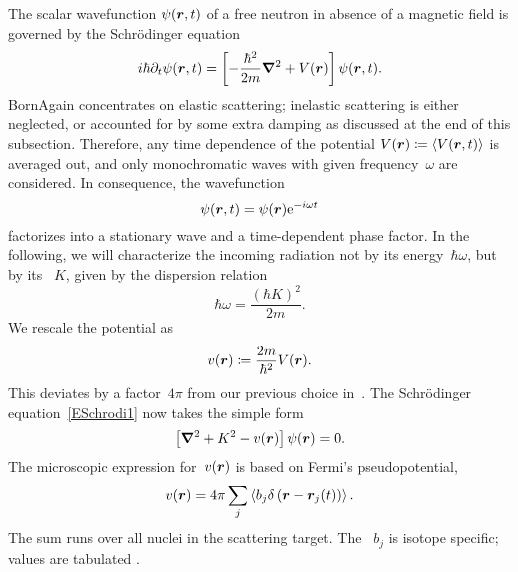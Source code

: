 The scalar wavefunction $\psi(\bm{r},t)$
%
%
%
of a free neutron
in absence of a magnetic field
is governed by the Schrödinger equation
%
\begin{equation}\label{ESchrodi1}
  i\hbar\partial_t \psi(\r,t)
  = \left[-\frac{\hbar^2}{2m}\Nabla^2+V(\r)\right] \psi(\r,t).
\end{equation}
BornAgain concentrates on elastic scattering;
%
inelastic scattering is either neglected,
%
or accounted for by some extra damping as discussed at the end of this subsection.
%
Therefore, any time dependence of the potential
%
%
$V(\bm{r})\coloneqq \langle V(\bm{r},t)\rangle$
%
 is averaged out,
and only monochromatic waves
with given frequency~$\omega$ are considered.
%
%
In consequence, the wavefunction
\begin{equation}\label{Estationarywave}
  \psi(\r,t) = \psi(\r)\e^{-i\omega t}
\end{equation}
%
factorizes into a stationary wave and a time-dependent phase factor.
%
In the following, we will characterize the incoming radiation
not by its energy~$\hbar\omega$,
but by its ~$K$,
%
%
given by the dispersion relation
%
\begin{equation}
  \hbar\omega = \frac{(\hbar K)^2}{2m}.
\end{equation}
We rescale the potential as
\begin{equation}\label{EvScale}
  v(\r)
  \coloneqq \frac{2m}{\hbar^2} V(\r).
\end{equation}
This deviates by a factor~$4\pi$ from our previous choice in~\cite{PoHB20}.
The Schrödinger equation~\cref{ESchrodi1} now takes the simple form
%
\begin{equation}\label{ESchrodi2}
  \left[\Nabla^2+K^2-v(\r)\right] \psi(\r) = 0.
\end{equation}
The microscopic expression for~$v(\bm{r})$ is based on Fermi's pseudopotential,
%
%
%
%
\begin{equation}\label{EvFermi}
  v(\r)
  = 4\pi\sum_j\left\langle b_j \delta\left(\r-\r_j(t)\right)\right\rangle.
\end{equation}
The sum runs over all nuclei in the scattering target.
The ~$b_j$
%
%
%
is isotope specific;
%
values are tabulated \cite{Sea92}.

